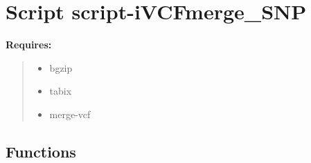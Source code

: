 %
%
%


\section{Script script-iVCFmerge\_SNP}

    \label{script-iVCFmerge_SNP}
\textbf{Requires:}
\begin{quote}
  \begin{itemize}

  \item
    \setlength{\parskip}{0.6ex}
bgzip



  \item tabix



  \item merge-vcf



\end{itemize}

\end{quote}



  \subsection{Functions}

    \label{script-iVCFmerge_SNP:get_parser}

    \vspace{0.5ex}

